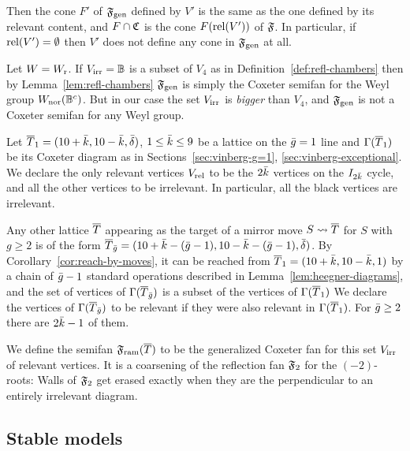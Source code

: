 \documentclass{amsart}
\begin{document}
Then the cone $F'$ of ${\mathfrak F}_{\rm gen}$ defined by $V'$ is the same as the
one defined by its relevant content, and $F\cap {\mathfrak C}$ is the cone
$F(\operatorname{rel}(V'))$ of ${\mathfrak F}$. In particular, if
$\operatorname{rel}(V')=\emptyset$ then $V'$ does not define any cone in
${\mathfrak F}_{\rm gen}$ at all.

\begin{remark}
  Let $W=W_{\rm r}$. 
  If $V_{\rm irr}={\mathbb B}$ is a subset of $V_4$ as in
  Definition~\ref{def:refl-chambers} then by
  Lemma~\ref{lem:refl-chambers} ${\mathfrak F}_{\rm gen}$ is simply the Coxeter semifan
  for the Weyl group $W_{\rm nor}({\mathbb B}^c)$. But in our case the set $V_{\rm irr}$
  is \emph{bigger} than $V_4$, and ${\mathfrak F}_{\rm gen}$ is not a Coxeter
  semifan for any Weyl group.
\end{remark}

\begin{definition}\label{def:the-semifan}
  Let ${\overline T}_1 = (10+\bar k, 10-\bar k, \bar \delta)$, $1\le \bar k\le 9$ be a
  lattice on the $\bar g=1$ line and $\Gamma({\overline T}_1)$ be its Coxeter
  diagram as in Sections~\ref{sec:vinberg-g=1},
  \ref{sec:vinberg-exceptional}.  We declare the only relevant
  vertices $V_{\rm rel}$ to be the $2\bar k$ vertices on the $I_{2\bar k}$ cycle,
  and all the other vertices to be irrelevant. In particular, all the
  black vertices are irrelevant.

  Any other lattice ${\overline T}$ appearing as the target of a mirror move
  $S\leadsto{\overline T}$ for $S$ with $g\ge2$ is of the form
  ${\overline T}_{\bar g} = (10+\bar k-(\bar g-1), 10-\bar k-(\bar g-1),\bar \delta)$.  By
  Corollary~\ref{cor:reach-by-moves}, it can be reached from
  ${\overline T}_1= (10+\bar k, 10-\bar k, 1)$ by a chain of $\bar g-1$ standard
  operations described in Lemma~\ref{lem:heegner-diagrams}, and the
  set of vertices of $\Gamma({\overline T}_{\bar g})$ is a subset of the vertices
  of $\Gamma({\overline T}_1)$ We declare the vertices of $\Gamma({\overline T}_{\bar g})$ to
  be relevant if they were also relevant in $\Gamma({\overline T}_1)$.  For
  $\bar g\ge2$ there are $2\bar k-1$ of them.

  We define the semifan ${\mathfrak F}_{\rm ram}({\overline T})$ to be the generalized Coxeter fan
  for this set $V_{\rm irr}$ of relevant vertices. It is a coarsening of the
  reflection fan ${\mathfrak F}_2$ for the $(-2)$-roots: Walls of ${\mathfrak F}_2$
  get erased exactly when they are the perpendicular to an entirely
  irrelevant diagram.
  
\end{definition}

\subsection{Stable models}
\label{sec:stable-models}
\end{document}

